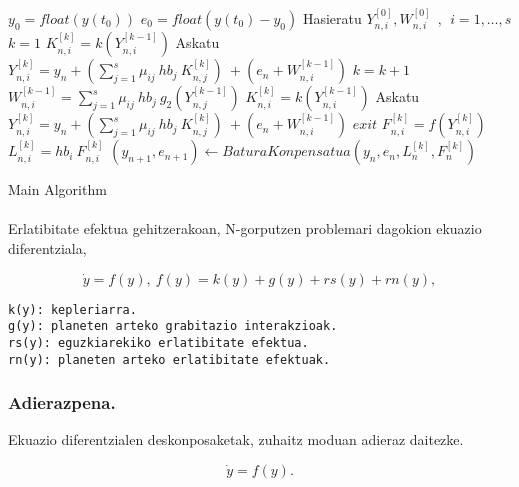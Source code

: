 \begin{algorithm}[H]
 \BlankLine
  $y_0=float(y(t_0))$\;
  $e_0=float(y(t_0)-y_0)$\;
  \BlankLine
  {
   \BlankLine
    Hasieratu  $Y_{n,i}^{[0]},W_{n,i}^{[0]} \ \ , \ \ i=1,\dots,s $\;  
    $k=1 $\;
    $K_{n,i}^{[k]}=k(Y_{n,i}^{[k-1]}) $\;
    Askatu $Y_{n,i}^{[k]}=y_{n}+ \left(\sum\limits_{j=1}^{s} \mu_{ij} \ hb_j \ K_{n,j}^{[k]} \right) \ + (e_{n}+ W_{n,i}^{[k-1]}) $\;
   \BlankLine
   {
    \BlankLine 
    $k=k+1$\;
    $W_{n,i}^{[k-1]}=\sum\limits_{j=1}^{s} \mu_{ij} \ hb_j \ g_2(Y_{n,j}^{[k-1]}) $\;  
    $K_{n,i}^{[k]}=k(Y_{n,i}^{[k-1]}) $\;
    Askatu $Y_{n,i}^{[k]}=y_{n}+ \left(\sum\limits_{j=1}^{s} \mu_{ij} \ hb_j \ K_{n,j}^{[k]} \right) \ + ( e_{n}+ W_{n,i}^{[k-1]}) $\;
   }
   \BlankLine
   {$exit$\;}
   {$F_{n,i}^{[k]}=f(Y_{n,i}^{[k]}) $\;
    $L_{n,i}^{[k]}=hb_i \ F_{n,i}^{[k]} $\;
    $(y_{n+1},e_{n+1})\leftarrow BaturaKonpensatua(y_n,e_n,L_n^{[k]},F_n^{[k]})$\;}    
   \BlankLine
   \BlankLine
 }
 \caption{Main Algorithm}
\end{algorithm}


\paragraph*{}Erlatibitate efektua gehitzerakoan, N-gorputzen problemari dagokion ekuazio diferentziala,

\begin{equation*}
\dot{y}=f(y), \ f(y)=k(y)+g(y)+rs(y)+rn(y),
\end{equation*}

\begin{lstlisting}
k(y): kepleriarra.
g(y): planeten arteko grabitazio interakzioak.
rs(y): eguzkiarekiko erlatibitate efektua.
rn(y): planeten arteko erlatibitate efektuak.
\end{lstlisting}

\subsubsection*{Adierazpena.}

Ekuazio diferentzialen deskonposaketak, zuhaitz moduan adieraz daitezke.

\begin{equation*}
\dot{y}=f(y).
\end{equation*}


